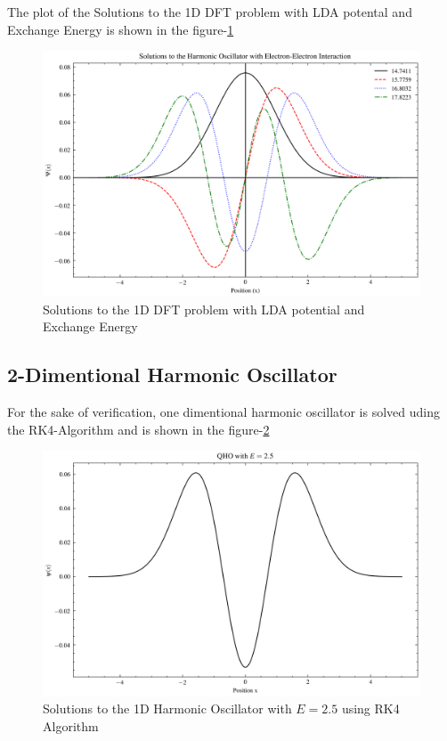 \documentclass{article}
\begin{document}
\begin{multicols}{2}
The plot of the Solutions to the 1D DFT problem with LDA potental and Exchange Energy is shown in the figure-\ref{1d_dft}

\begin{figure}[H]
    \centering
    \includegraphics[width = \columnwidth]{Images/1DDFT.png}
    \caption{Solutions to the 1D DFT problem with LDA potential and Exchange Energy}
    \label{1d_dft}
\end{figure}


\subsection{2-Dimentional Harmonic Oscillator}

For the sake of verification, one dimentional harmonic oscillator is solved uding the RK4-Algorithm and is shown in the figure-\ref{1d-ver}

\begin{figure}[H]
    \centering
    \includegraphics[width = \columnwidth]{Images/1d_ver.png}
    \caption{Solutions to the 1D Harmonic Oscillator with $E = 2.5$ using RK4 Algorithm}
    \label{1d-ver}
\end{figure}



\end{multicols}
\end{document}
